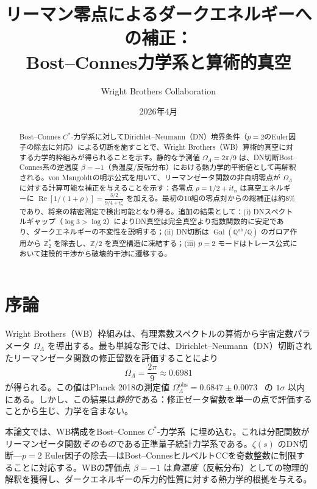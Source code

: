 \documentclass[12pt,a4paper]{article}
\title{リーマン零点によるダークエネルギーへの補正：\\
Bost--Connes力学系と算術的真空}
\author{Wright Brothers Collaboration}
\date{2026年4月}
\newcommand{\Gal}{\operatorname{Gal}}
\newcommand{\OL}{\Omega_\Lambda}
\newcommand{\Qab}{\mathbb{Q}^{\mathrm{ab}}}
\begin{document}
\maketitle

\begin{abstract}
Bost--Connes $C^*$-力学系に対してDirichlet--Neumann（DN）境界条件（$p=2$のEuler因子の除去に対応）による切断を施すことで、Wright Brothers（WB）算術的真空に対する力学的枠組みが得られることを示す。静的な予測値 $\OL = 2\pi/9$ は、DN切断Bost--Connes系の逆温度 $\beta = -1$（負温度/反転分布）における熱力学的平衡値として再解釈される。von Mangoldtの明示公式を用いて、リーマンゼータ関数の非自明零点が $\OL$ に対する計算可能な補正を与えることを示す：各零点 $\rho = 1/2 + it_n$ は真空エネルギーに $\operatorname{Re}[1/(1+\rho)] = \frac{3/2}{9/4 + t_n^2}$ を加える。最初の10組の零点対からの総補正は約$8\%$であり、将来の精密測定で検出可能となり得る。追加の結果として：(i) DNスペクトルギャップ（$\log 3 > \log 2$）によりDN真空は完全真空より指数関数的に安定であり、ダークエネルギーの不変性を説明する；(ii) DN切断は $\Gal(\Qab/\mathbb{Q})$ のガロア作用から $\mathbb{Z}_2^*$ を除去し、$\mathbb{Z}/2$ を真空構造に凍結する；(iii) $p=2$ モードはトレース公式において建設的干渉から破壊的干渉に遷移する。
\end{abstract}

\tableofcontents

\section{序論}
\label{sec:intro}

Wright Brothers（WB）枠組みは、有理素数スペクトルの算術から宇宙定数パラメータ $\OL$ を導出する。最も単純な形では、Dirichlet--Neumann（DN）切断されたリーマンゼータ関数の修正留数を評価することにより
\begin{equation}\label{eq:OL-static}
  \OL = \frac{2\pi}{9} \approx 0.6981
\end{equation}
が得られる。この値はPlanck 2018の測定値 $\OL^{\mathrm{obs}} = 0.6847 \pm 0.0073$~\cite{Planck2018} の $1\sigma$ 以内にある。しかし、この結果は\emph{静的}である：修正ゼータ留数を単一の点で評価することから生じ、力学を含まない。

本論文では、WB構成をBost--Connes $C^*$-力学系~\cite{BostConnes1995}に埋め込む。これは分配関数がリーマンゼータ関数\emph{そのもの}である正準量子統計力学系である。$\zeta(s)$ のDN切断---$p=2$ Euler因子の除去---はBost--ConnesヒルベルトCCを奇数整数に制限することに対応する。WBの評価点 $\beta = -1$ は\emph{負温度}（反転分布）としての物理的解釈を獲得し、ダークエネルギーの斥力的性質に対する熱力学的根拠を与える。
\end{document}
